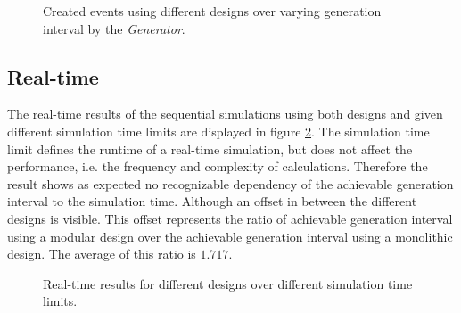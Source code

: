 \begin{figure}
    \centering
    \caption{Created events using different designs over varying generation interval by the \emph{Generator}.}
    \label{fig:results_event_generation}
\end{figure}

\subsection{Real-time}
\label{sec:measurements_sequential_realtime}

The real-time results of the sequential simulations using both designs and given different simulation time limits are displayed in figure \ref{fig:results_realtime_sim_time}.
The simulation time limit defines the runtime of a real-time simulation, but does not affect the performance, i.e. the frequency and complexity of calculations.
Therefore the result shows as expected no recognizable dependency of the achievable generation interval to the simulation time.
Although an offset in between the different designs is visible.
This offset represents the ratio of achievable generation interval using a modular design over the achievable generation interval using a monolithic design.
The average of this ratio is $1.717$.\\

\begin{figure}
    \centering
    \caption{Real-time results for different designs over different simulation time limits.}
    \label{fig:results_realtime_sim_time}
\end{figure}

